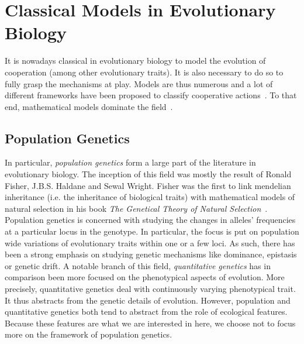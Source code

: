 

\section{Classical Models in Evolutionary Biology}

    It is nowadays classical in evolutionary biology to model the evolution of cooperation (among other evolutionary traits). It is also necessary to do so to fully grasp the mechanisms at play. Models are thus numerous and a lot of different frameworks have been proposed to classify cooperative actions~\parencite{Dugatkin2002, Sachs2004, Lehmann2006}. To that end, mathematical models dominate the field~\parencite{Servedio2014}. 

    \subsection{Population Genetics}

        In particular, \emph{population genetics} form a large part of the literature in evolutionary biology. The inception of this field was mostly the result of Ronald Fisher, J.B.S. Haldane and Sewal Wright. Fisher was the first to link mendelian inheritance (i.e. the inheritance of biological traits) with mathematical models of natural selection in his book \textit{The Genetical Theory of Natural Selection}~\parencite{Fisher1930}. Population genetics is concerned with studying the changes in alleles' frequencies at a particular locus in the genotype. In particular, the focus is put on population wide variations of evolutionary traits within one or a few loci. As such, there has been a strong emphasis on studying genetic mechanisms like dominance, epistasis or genetic drift. A notable branch of this field, \emph{quantitative genetics} has in comparison been more focused on the phenotypical aspects of evolution. More precisely, quantitative genetics deal with continuously varying phenotypical trait. It thus abstracts from the genetic details of evolution. However, population and quantitative genetics both tend to abstract from the role of ecological features. Because these features are what we are interested in here, we choose not to focus more on the framework of population genetics.



